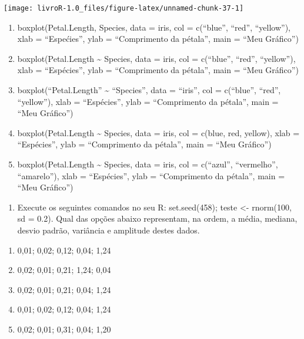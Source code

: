 \documentclass[14pt,titlepage, oneside, openany, a4paper]{book}
\providecommand{\tightlist}{%
  \setlength{\itemsep}{0pt}\setlength{\parskip}{0pt}}
\begin{document}
\begin{center}\texttt{[image: livroR-1.0\_files/figure-latex/unnamed-chunk-37-1]} \end{center}

\begin{enumerate}
\def\labelenumi{(\alph{enumi})}
\tightlist
\item
  boxplot(Petal.Length,
  Species,
  data = iris,
  col = c(``blue'', ``red'', ``yellow''),
  xlab = ``Espećies'',
  ylab = ``Comprimento da pétala'',
  main = ``Meu Gráfico'')
\item
  boxplot(Petal.Length \textasciitilde{} Species,
  data = iris,
  col = c(``blue'', ``red'', ``yellow''),
  xlab = ``Espécies'',
  ylab = ``Comprimento da pétala'',
  main = ``Meu Gráfico'')
\item
  boxplot(``Petal.Length'' \textasciitilde{} ``Species'',
  data = ``iris'',
  col = c(``blue'', ``red'', ``yellow''),
  xlab = ``Espécies'',
  ylab = ``Comprimento da pétala'',
  main = ``Meu Gráfico'')
\item
  boxplot(Petal.Length \textasciitilde{} Species,
  data = iris,
  col = c(blue, red, yellow),
  xlab = ``Espécies'',
  ylab = ``Comprimento da pétala'',
  main = ``Meu Gráfico'')
\item
  boxplot(Petal.Length \textasciitilde{} Species,
  data = iris,
  col = c(``azul'', ``vermelho'', ``amarelo''),
  xlab = ``Espécies'',
  ylab = ``Comprimento da pétala'',
  main = ``Meu Gráfico'')
\end{enumerate}

\begin{enumerate}
\def\labelenumi{\arabic{enumi})}
\setcounter{enumi}{4}
\tightlist
\item
  Execute os seguintes comandos no seu R: set.seed(458); teste \textless{}- rnorm(100, sd = 0.2). Qual das opções abaixo representam, na ordem, a média, mediana, desvio padrão, variância e amplitude destes dados.
\end{enumerate}

\begin{enumerate}
\def\labelenumi{(\alph{enumi})}
\tightlist
\item
  0,01; 0,02; 0,12; 0,04; 1,24
\item
  0,02; 0,01; 0,21; 1,24; 0,04
\item
  0,02; 0,01; 0,21; 0,04; 1,24
\item
  0,01; 0,02; 0,12; 0,04; 1,24
\item
  0,02; 0,01; 0,31; 0,04; 1,20
\end{enumerate}
\end{document}
